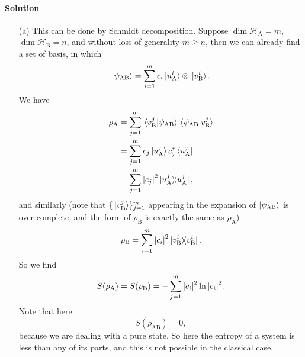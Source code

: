 \documentclass[hyperref, a4paper]{article}
\begin{document}
\paragraph{Solution} \begin{itemize}
\item[(a)] This can be done by Schmidt decomposition. 
Suppose $\dim \mathcal{H}_{\text{A}} = m$, 
$\dim \mathcal{H}_{\text{B}} = n$,
and without loss of generality $m \geq n$,
then we can already find a set of basis, in which
\begin{equation}
    \ket{\psi_{\text{AB}}} = \sum_{i = 1}^m c_{i} \ket*{u^i_{\text{A}}} \otimes \ket*{v^i_{\text{B}}}.
    \label{eq:schmidt}
\end{equation}
We have 
\begin{equation}
    \begin{aligned}
        \rho_\text{A} &= \sum_{j=1}^m 
        \braket*{v_\text{B}^j}{\psi_{\text{AB}}}
        \braket*{\psi_{\text{AB}}}{v_\text{B}^j} \\
        &= \sum_{j=1}^m c_{j} \ket*{u^j_{\text{A}}} c_{j}^* \bra*{u^{j}_{\text{A}}} \\
        &= \sum_{j=1}^m \abs{c_j}^2 \dyad*{u^j_{\text{A}}}{u^{j}_{\text{A}}},
    \end{aligned}
\end{equation}
and similarly (note that $\{\ket*{v^j_{\text{B}}}\}_{j=1}^m$ 
appearing in the expansion of $\ket{\psi_{\text{AB}}}$ is over-complete,
and the form of $\rho_{\text{B}}$ is exactly the same as $\rho_{\text{A}}$)
\begin{equation}
    \rho_\text{B} = \sum_{i=1}^m \abs{c_{i}}^2 \dyad*{v_{\text{B}}^i}{v_{\text{B}}^{i}}.
\end{equation}
So we find 
\begin{equation}
    S(\rho_\text{A}) = S(\rho_{\text{B}}) = - \sum_{j=1}^m \abs{c_{i}}^2 \ln \abs{c_{i}}^2.
\end{equation}
Note that here 
\begin{equation}
    S(\rho_{\text{AB}}) = 0,
\end{equation}
because we are dealing with a pure state.
So here the entropy of a system is less than any of its parts,
and this is not possible in the classical case.


\end{itemize}
\end{document}
